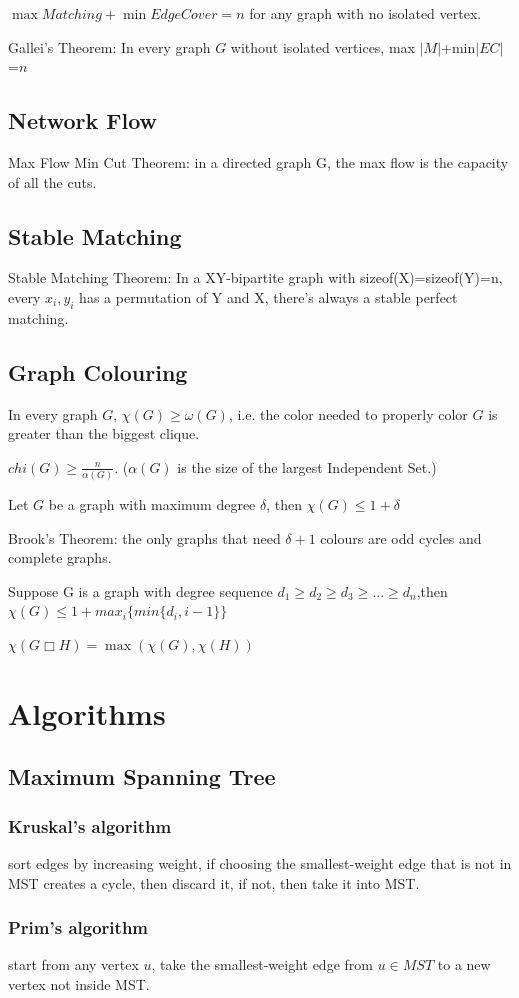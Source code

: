 \documentclass[12pt,a4paper]{ctexrep}
\begin{document}
$\max{Matching}+\min{Edge Cover}=n$ for any graph with no isolated vertex.

Gallei's Theorem: In every graph $G$ without isolated vertices, max $|M|$+min$|EC|$=$n$
\subsection{Network Flow}
Max Flow Min Cut Theorem: in a directed graph G, the max flow is the capacity of all the cuts.
\subsection{Stable Matching}
Stable Matching Theorem: In a XY-bipartite graph with sizeof(X)=sizeof(Y)=n, every $x_{i},y_{i}$ has a permutation of Y and X, there's always a stable perfect matching.
\subsection{Graph Colouring}
In every graph $G$, $\chi(G) \geq \omega(G)$, i.e. the color needed to properly color $G$ is greater than the biggest clique.

$chi(G)\geq \frac{n}{\alpha(G)}$. ($\alpha(G)$ is the size of the largest Independent Set.)

Let $G$ be a graph with maximum degree $\delta$, then $\chi(G) \leq 1+\delta$

Brook's Theorem: the only graphs that need $\delta +1$ colours are odd cycles and complete graphs.\

Suppose G is a graph with degree sequence $d_{1}\geq d_{2} \geq d_{3} \geq \dots \geq d_{n}$,then $\chi(G) \leq 1+max_{i}\{min\{d_{i},i-1\}\}$

$\chi(G\Box H)=\max(\chi(G),\chi(H))$
\section{Algorithms}
\subsection{Maximum Spanning Tree}
\subsubsection{Kruskal's algorithm}
sort edges by increasing weight, if choosing the smallest-weight edge that is not in MST creates a cycle, then discard it, if not, then take it into MST.
\subsubsection{Prim's algorithm}
start from any vertex $u$, take the smallest-weight edge from $u \in MST$ to a new vertex not inside MST.
\end{document}
